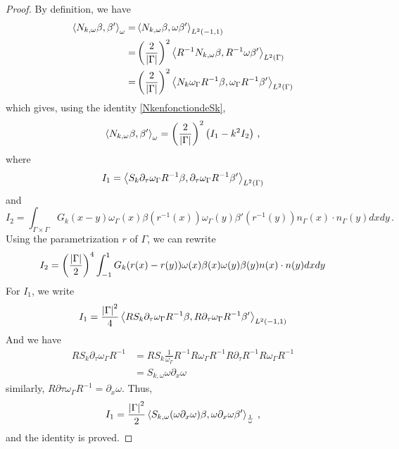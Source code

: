 \documentclass[a4paper]{article}
\begin{document}
\begin{proof}
	By definition, we have
	\begin{equation*}
	\label{NkomegaenfonctiondeSkomega}
	\begin{split}
	\left\langle N_{k,\omega} \beta,\beta'\right\rangle_\omega = 
	&\left\langle N_{k,\omega} \beta,\omega \beta'\right\rangle_{L^2(-1,1)}\\
	=&\left(\frac{2}{\left\lvert \Gamma \right\rvert}\right)^2\left\langle R^{-1}N_{k,\omega} \beta,R^{-1}\omega \beta'\right\rangle_{L^2(\Gamma)}\\
	= &\left(\frac{2}{\left\lvert \Gamma \right\rvert}\right)^2\left\langle N_{k}\omega_\Gamma R^{-1} \beta,\omega_\Gamma R^{-1}\beta'\right\rangle_{L^2(\Gamma)}
	\end{split}
	\end{equation*}
	which gives, using the identity \eqref{NkenfonctiondeSk},
	\begin{equation*}
		\left\langle N_{k,\omega} \beta,\beta'\right\rangle_\omega =\left(\frac{2}{\left\lvert \Gamma \right\rvert}\right)^2 \left(I_1 -k^2 I_2\right)\,,
	\end{equation*}
	where 
	\[I_1=\left\langle S_{k}\partial_\tau\omega_\Gamma R^{-1} \beta,\partial_\tau\omega_\Gamma R^{-1}\beta'\right\rangle_{L^2(\Gamma)}\]
	and 
	\[I_2 = \int_{\Gamma \times \Gamma}G_k(x - y) \omega_\Gamma(x) \beta(r^{-1}(x))\omega_\Gamma(y)\beta'(r^{-1}(y)) n_\Gamma(x)\cdot n_\Gamma(y) dxdy\,.\]
	Using the parametrization $r$ of $\Gamma$, we can rewrite
	\begin{equation*}
		I_2 = \left(\frac{\left\lvert \Gamma \right\rvert}{2}\right)^4\int_{-1}^{1} G_k(r(x)-r(y)) \omega(x)\beta(x) \omega(y)\beta(y)n(x) \cdot n(y)dxdy
	\end{equation*}
	For $I_1$, we write 
	\begin{equation*}
		\begin{split}
		I_1=\frac{\left\lvert \Gamma \right\rvert^2}{4}\left\langle RS_{k}\partial_\tau\omega_\Gamma R^{-1} \beta,R\partial_\tau\omega_\Gamma R^{-1}\beta'\right\rangle_{L^2(-1,1)}
		\end{split}
	\end{equation*}
	And we have 
	\[\begin{split}
	RS_k \partial_\tau \omega_\Gamma R^{-1} &= RS_k\frac{1}{\omega_\Gamma} R^{-1} R \omega_\Gamma R^{-1} R\partial_\tau R^{-1} R \omega_\Gamma R^{-1}\\
	&=  S_{k,\omega} \omega \partial_x \omega
	\end{split}\]
	similarly, $R\partial\tau \omega_\Gamma R^{-1} = \partial_x \omega $. Thus, 
	\[I_1 = \frac{\left\lvert \Gamma \right\rvert^2}{2}\left\langle S_{k,\omega}(\omega\partial_x \omega) \beta,\omega \partial_x \omega \beta'\right\rangle_\frac{1}{\omega}\,,\]
	and the identity is proved. 
\end{proof}
\end{document}
